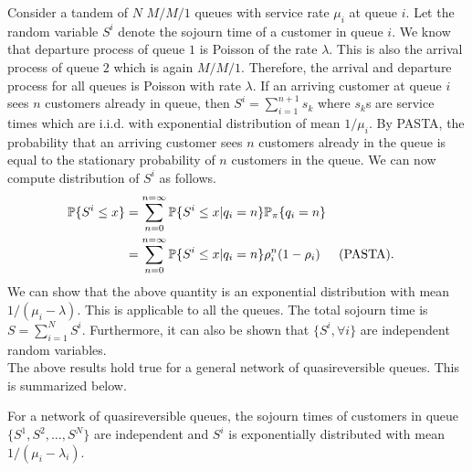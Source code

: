 \documentclass[all-lectures.tex]{subfiles}
\begin{document}
\indent Consider a tandem of $N$ $M/M/1$ queues with service rate $\mu_i$ at queue $i$. Let the random variable $S^i$ denote the sojourn time of a customer in queue $i$. We know that departure process of queue $1$ is Poisson of the rate $\lambda$. This is also the arrival process of queue $2$ which is again $M/M/1$. Therefore, the arrival and departure process for all queues is Poisson with rate $\lambda$. If an arriving customer at queue $i$ sees $n$ customers already in queue, then $S^i = \sum_{i=1}^{n+1} s_k$ where $s_k$s are service times which are i.i.d. with exponential distribution of mean $1/\mu_i$. By PASTA, the probability that an arriving customer sees $n$ customers already in the queue is equal to the stationary probability of $n$ customers in the queue. We can now compute distribution of $S^i$ as follows.
\begin{align*}
\P\{S^i \leq x\} &= \sum_{n=0}^{n=\infty} \P\{S^i \leq x | q_i = n\} \P_{\pi}\{ q_i = n\} \\
&= \sum_{n=0}^{n=\infty} \P\{S^i \leq x | q_i = n\} \rho_i^n (1-\rho_i) && \text{(PASTA)}.
\end{align*}
We can show that the above quantity is an exponential distribution with mean $1/(\mu_i - \lambda)$. This is applicable to all the queues. The total sojourn time is $S = \sum_{i=1}^N S^i$. Furthermore, it can also be shown that $\{S^i, \forall i\}$ are independent random variables. \\
\indent The above results hold true for a general network of quasireversible queues. This is summarized below. 
\begin{prop}
For a network of quasireversible queues, the sojourn times of customers in queue $\{S^1,S^2,\dots,S^N\}$ are independent and $S^i$ is exponentially distributed with mean $1/(\mu_i - \lambda_i)$.
\end{prop}
\end{document}
